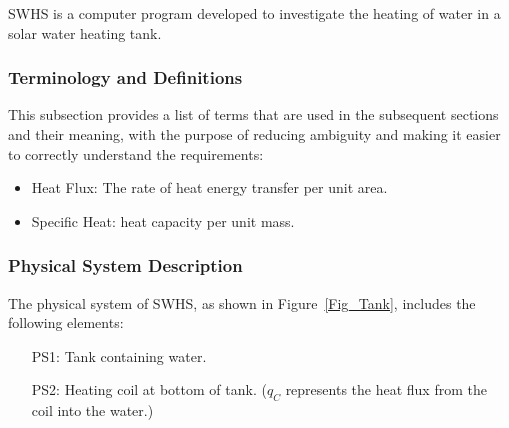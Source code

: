 \documentclass[12pt]{article}
\newcommand{\progname}{SWHS}
\begin{document}
\progname{} is a computer program developed to investigate the 
heating of water in a solar water heating tank.


\subsubsection{Terminology and  Definitions}

This subsection provides a list of terms that are used in the subsequent
sections and their meaning, with the purpose of reducing ambiguity and making it
easier to correctly understand the requirements:

\begin{itemize}

\item Heat Flux: The rate of heat energy transfer per unit area.


\item Specific Heat: heat capacity per unit mass.



\end{itemize}

\subsubsection{Physical System Description}

The physical system of \progname{}, as shown in Figure~\ref{Fig_Tank},
includes the following elements:

\begin{itemize}

\item[PS1:] Tank containing water.

\item[PS2:] Heating coil at bottom of tank.  ($q_C$ represents the heat flux
  from the coil into the water.)


\end{itemize}
\end{document}

